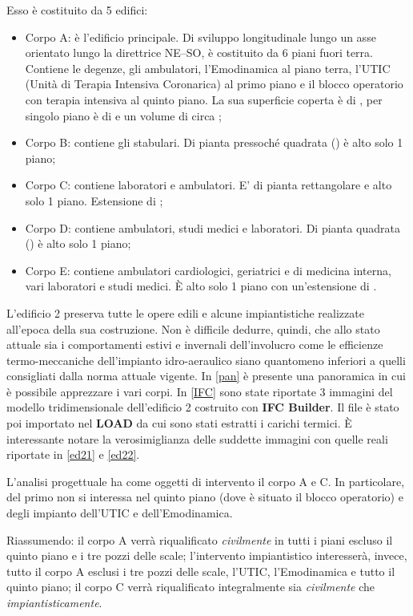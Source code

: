 Esso è costituito da 5 edifici:
\begin{itemize}
	\item Corpo A: è l'edificio principale. Di sviluppo longitudinale lungo un asse orientato lungo la direttrice NE--SO, è costituito da 6 piani fuori terra. Contiene le degenze, gli ambulatori, l'Emodinamica al piano terra, l'UTIC (Unità di Terapia Intensiva Coronarica) al primo piano e il blocco operatorio con terapia intensiva al quinto piano. La sua superficie coperta è di , per singolo piano è di  e un volume di circa ;
	\item Corpo B: contiene gli stabulari. Di pianta pressoché quadrata () è alto solo 1 piano; 
	\item Corpo C: contiene laboratori e ambulatori. E' di pianta rettangolare e alto solo 1 piano. Estensione di ;
	\item Corpo D: contiene ambulatori, studi medici e laboratori. Di pianta quadrata () è alto solo 1 piano; 
	\item Corpo E: contiene ambulatori cardiologici, geriatrici e di medicina interna, vari laboratori e studi medici. È alto solo 1 piano con un'estensione di .
\end{itemize}

L'edificio 2 preserva tutte le opere edili e alcune impiantistiche realizzate all'epoca della sua costruzione. Non è difficile dedurre, quindi, che allo stato attuale sia i comportamenti estivi e invernali dell'involucro come le efficienze termo-meccaniche dell'impianto idro-aeraulico siano quantomeno inferiori a quelli consigliati dalla norma attuale vigente. In \vref{pan} è presente una panoramica in cui è possibile apprezzare i vari corpi. In \vref{IFC} sono state riportate \num{3} immagini del modello tridimensionale dell'edificio 2 costruito con \textbf{IFC Builder}. Il file è stato poi importato nel \textbf{LOAD} da cui sono stati estratti i carichi termici. È interessante notare la verosimiglianza delle suddette immagini con quelle reali riportate in \vref{ed21} e \ref{ed22}.

L'analisi progettuale ha come oggetti di intervento il corpo A e C. In particolare, del primo non si interessa nel quinto piano (dove è situato il blocco operatorio) e degli impianto dell'UTIC e dell'Emodinamica.

Riassumendo: il corpo A verrà riqualificato \emph{civilmente} in tutti i piani escluso il quinto piano e i tre pozzi delle scale; l'intervento impiantistico interesserà, invece, tutto il corpo A esclusi i tre pozzi delle scale, l'UTIC, l'Emodinamica e tutto il quinto piano; il corpo C verrà riqualificato integralmente sia \emph{civilmente} che \emph{impiantisticamente}.

